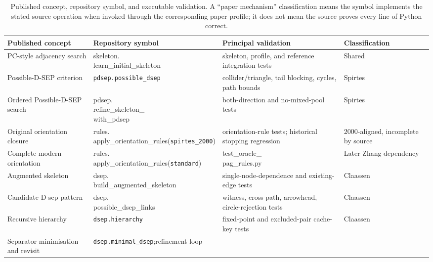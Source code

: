 \documentclass[11pt,a4paper]{article}
\newcommand{\code}[1]{\texttt{#1}}
\begin{document}
\begin{table}[H]
\caption{Published concept, repository symbol, and executable validation. A
``paper mechanism'' classification means the symbol implements the stated
source operation when invoked through the corresponding paper profile; it does
not mean the source proves every line of Python correct.}
\label{tab:traceability}
\footnotesize
\begin{tabularx}{\textwidth}{p{}p{}Yp{0.125\textwidth}}
\toprule
Published concept & Repository symbol & Principal validation &
Classification \\
\midrule
PC-style adjacency search &
\code{skeleton.\newline learn\_initial\_skeleton} &
skeleton, profile, and reference integration tests &
Shared \\
Possible-D-SEP criterion &
\code{pdsep.possible\_dsep} &
collider/triangle, tail blocking, cycles, path bounds &
Spirtes \\
Ordered Possible-D-SEP search &
\code{pdsep.\newline refine\_skeleton\_\newline with\_pdsep} &
both-direction and no-mixed-pool tests &
Spirtes \\
Original orientation closure &
\code{rules.\newline apply\_orientation\_rules}\newline (\code{spirtes\_2000}) &
orientation-rule tests; historical stopping regression &
2000-aligned, incomplete by source \\
Complete modern orientation &
\code{rules.\newline apply\_orientation\_rules}\newline (\code{standard}) &
\code{test\_oracle\_\newline pag\_rules.py} &
Later Zhang dependency \\
Augmented skeleton &
\code{dsep.\newline build\_augmented\_skeleton} &
single-node-dependence and existing-edge tests &
Claassen \\
Candidate D-sep pattern &
\code{dsep.\newline possible\_dsep\_links} &
witness, cross-path, arrowhead, circle-rejection tests &
Claassen \\
Recursive hierarchy &
\code{dsep.hierarchy} &
fixed-point and excluded-pair cache-key tests &
Claassen \\
Separator minimisation and revisit &
\code{dsep.minimal\_dsep};\newline refinement loop &

\end{tabularx}
\end{table}
\end{document}
